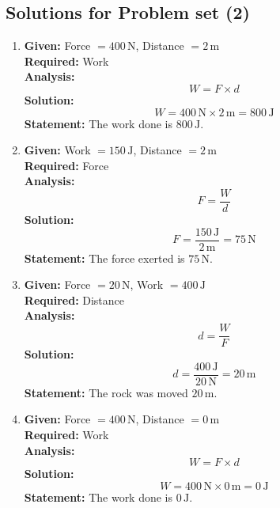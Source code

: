 \documentclass{article}
\begin{document}
\subsection*{Solutions for Problem set (2)}

\begin{enumerate}
    \item \textbf{Given:} Force $= 400\,\mathrm{N}$, Distance $= 2\,\mathrm{m}$ \\
    \textbf{Required:} Work \\
    \textbf{Analysis:}
    \[
        W = F \times d
    \]
    \textbf{Solution:}
    \[
        W = 400\,\mathrm{N} \times 2\,\mathrm{m} = 800\,\mathrm{J}
    \]
    \textbf{Statement:} The work done is $800\,\mathrm{J}$.

    \item \textbf{Given:} Work $= 150\,\mathrm{J}$, Distance $= 2\,\mathrm{m}$ \\
    \textbf{Required:} Force \\
    \textbf{Analysis:}
    \[
        F = \frac{W}{d}
    \]
    \textbf{Solution:}
    \[
        F = \frac{150\,\mathrm{J}}{2\,\mathrm{m}} = 75\,\mathrm{N}
    \]
    \textbf{Statement:} The force exerted is $75\,\mathrm{N}$.

    \item \textbf{Given:} Force $= 20\,\mathrm{N}$, Work $= 400\,\mathrm{J}$ \\
    \textbf{Required:} Distance \\
    \textbf{Analysis:}
    \[
        d = \frac{W}{F}
    \]
    \textbf{Solution:}
    \[
        d = \frac{400\,\mathrm{J}}{20\,\mathrm{N}} = 20\,\mathrm{m}
    \]
    \textbf{Statement:} The rock was moved $20\,\mathrm{m}$.

    \item \textbf{Given:} Force $= 400\,\mathrm{N}$, Distance $= 0\,\mathrm{m}$ \\
    \textbf{Required:} Work \\
    \textbf{Analysis:}
    \[
        W = F \times d
    \]
    \textbf{Solution:}
    \[
        W = 400\,\mathrm{N} \times 0\,\mathrm{m} = 0\,\mathrm{J}
    \]
    \textbf{Statement:} The work done is $0\,\mathrm{J}$.
\end{enumerate}
\end{document}
